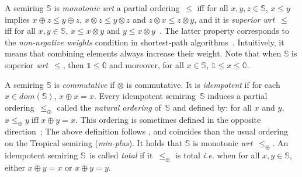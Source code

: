 \documentclass[runningheads]{llncs}
\def\ie{\textit{i.e.}\xspace}
\def\wrt{\textit{wrt}\xspace}
\newcommand{\Semiring}{\mathbb{S}}
\newcommand{\zero}{\mathbb{0}}
\newcommand{\one}{\mathbb{1}}
\newcommand{\dom}{\ensuremath{\mathit{dom}}}
\begin{document}
A semiring $\Semiring$ 
is \emph{monotonic} \wrt a partial ordering~$\leq$ 
iff for all $x, y, z  \in \Semiring$,  $x \leq y$ implies
$x \oplus z \leq y \oplus z$,
$x \otimes z \leq y \otimes z$
and $z \otimes x \leq z \otimes y$,
%
and it is \emph{superior} %
\wrt~$\leq$ iff for all $x, y \in \Semiring$,  
$x \leq x \otimes y$ and 
$y \leq x \otimes y$~\cite{Huang08advanceddynamic}.
The latter property corresponds to the 
\emph{non-negative weights} condition in shortest-path algorithms~\cite{Dijkstra59anote}.
Intuitively, it means that combining elements always increase their weight. 
Note that when $\Semiring$ is superior \wrt~$\leq$, then $\one \leq \zero$
and moreover, for all $x \in \Semiring$, $\one \leq x \leq \zero$.

A semiring $\Semiring$ is \emph{commutative} if $\otimes$ is commutative.
It is \emph{idempotent} if for each $x \in \dom(\Semiring)$, $x \oplus x = x$.
%
%
Every idempotent semiring~$\Semiring$ induces 
a partial ordering~$\leq_\oplus$ 
called the \emph{natural ordering} of~$\Semiring$
and defined by: 
for all $x$ and $y$,
$x \leq_\oplus y \;\mbox{iff}\; x \oplus y = x$.
This ordering is sometimes defined in the opposite direction~\cite{DrosteKuich09semirings};
The above definition follows \cite{Mohri02semiring}, 
and coincides than the usual ordering on the Tropical semiring (\emph{min-plus}).
%
It holds that $\Semiring$ is {monotonic} \wrt~$\leq_\oplus$.
An idempotent semiring $\Semiring$~is called \emph{total} if
it~$\leq_\oplus$ is total
\ie when for all $x, y \in \Semiring$, either $x \oplus y = x$ or $x \oplus y = y$.
\end{document}

